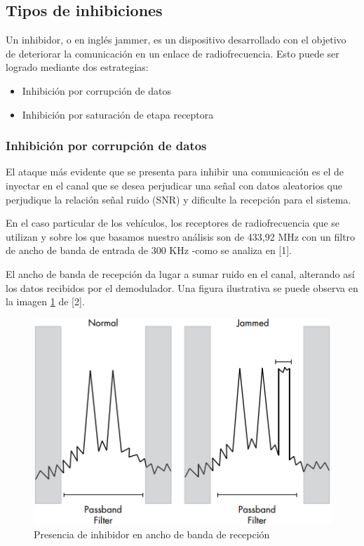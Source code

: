 \subsection{Tipos de inhibiciones} \label{cap:tiposdeinhibiciones}

Un inhibidor, o en inglés jammer, es un dispositivo desarrollado con el objetivo de deteriorar la comunicación en un enlace de 
radiofrecuencia. Esto puede ser logrado mediante dos estrategias:

\begin{itemize}
    \item Inhibición por corrupción de datos
    \item Inhibición por saturación de etapa receptora

\end{itemize}

\subsubsection{Inhibición por corrupción de datos}

El ataque más evidente que se presenta para inhibir una comunicación es el de inyectar en el canal que se desea perjudicar una señal con 
datos aleatorios que perjudique la relación señal ruido (SNR) y dificulte la recepción para el sistema. \par
En el caso particular de los vehículos, los receptores de radiofrecuencia que se utilizan y sobre los que basamos nuestro análisis
son de 433,92 MHz con un filtro de ancho de banda de entrada de 300 KHz -como se analiza en [1].\par
El ancho de banda de recepción da lugar a sumar ruido en el canal, alterando así los datos recibidos por el demodulador. Una figura
ilustrativa se puede observa en la imagen \ref{fpb_jam} de [2].

\begin{figure}[htb]
	\centering
	\includegraphics[scale=0.8]{images/fpb_jam.png}
	\caption{Presencia de inhibidor en ancho de banda de recepción}
	\label{fpb_jam}
\end{figure}

